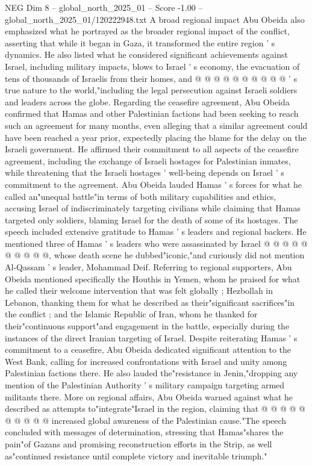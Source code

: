 \begin{textsample}{NEG Dim 8 – global\_north\_2025\_01 – Score -1.00 – global\_north\_2025\_01/120222948.txt}
A broad regional impact Abu Obeida also emphasized what he portrayed as the broader regional impact of the conflict, asserting that while it began in Gaza, it transformed the entire region ' s dynamics.
He also listed what he considered significant achievements against Israel, including military impacts, blows to Israel ' s economy, the evacuation of tens of thousands of Israelis from their homes, and @ @ @ @ @ @ @ @ @ @ ' s true nature to the world,"including the legal persecution against Israeli soldiers and leaders across the globe.
Regarding the ceasefire agreement, Abu Obeida confirmed that Hamas and other Palestinian factions had been seeking to reach such an agreement for many months, even alleging that a similar agreement could have been reached a year prior, expectedly placing the blame for the delay on the Israeli government.
He affirmed their commitment to all aspects of the ceasefire agreement, including the exchange of Israeli hostages for Palestinian inmates, while threatening that the Israeli hostages ' well-being depends on Israel ' s commitment to the agreement.
Abu Obeida lauded Hamas ' s forces for what he called an"unequal battle"in terms of both military capabilities and ethics, accusing Israel of indiscriminately targeting civilians while claiming that Hamas targeted only soldiers, blaming Israel for the death of some of its hostages.
The speech included extensive gratitude to Hamas ' s leaders and regional backers.
He mentioned three of Hamas ' s leaders who were assassinated by Israel @ @ @ @ @ @ @ @ @ @, whose death scene he dubbed"iconic,"and curiously did not mention Al-Qassam ' s leader, Mohammad Deif.
Referring to regional supporters, Abu Obeida mentioned specifically the Houthis in Yemen, whom he praised for what he called their welcome intervention that was felt globally ; Hezbollah in Lebanon, thanking them for what he described as their"significant sacrifices"in the conflict ; and the Islamic Republic of Iran, whom he thanked for their"continuous support"and engagement in the battle, especially during the instances of the direct Iranian targeting of Israel.
Despite reiterating Hamas ' s commitment to a ceasefire, Abu Obeida dedicated significant attention to the West Bank, calling for increased confrontations with Israel and unity among Palestinian factions there.
He also lauded the"resistance in Jenin,"dropping any mention of the Palestinian Authority ' s military campaign targeting armed militants there.
More on regional affairs, Abu Obeida warned against what he described as attempts to"integrate"Israel in the region, claiming that @ @ @ @ @ @ @ @ @ @ increased global awareness of the Palestinian cause."The speech concluded with messages of determination, stressing that Hamas"shares the pain"of Gazans and promising reconstruction efforts in the Strip, as well as"continued resistance until complete victory and inevitable triumph."

\end{textsample}
